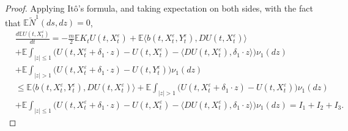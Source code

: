 \documentclass[11pt,reqno]{amsart}
\numberwithin{equation}{section}
\begin{document}
\begin{proof}
Applying It\^{o}'s formula, and taking expectation on both sides, with the fact that $\mathbb{E}\tilde{N}^{1}(ds,dz)=0$,	\begin{equation}\label{3.9}
	\begin{split}
	&\frac{d\mathbb{E}U(t,X_{t}^{\varepsilon})}{dt}=-\frac{m}{2}\mathbb{E}K_{t}U(t,X_{t}^{\varepsilon})+\mathbb{E}\langle  b(t,X_{t}^{\varepsilon},Y_{t}^{\varepsilon}),DU(t,X_{t}^{\varepsilon})\rangle  \\
	&+\mathbb{E} \int_{|z|\leq 1}\big( U(t,X_{t}^{\varepsilon}+\delta_{1}\cdot z)-U(t,X_{t}^{\varepsilon})-\langle  DU(t,X_{t}^{\varepsilon}), \delta_{1}\cdot z\rangle   \big) \nu_{1}(dz)\\
	&+\mathbb{E} \int_{|z|> 1}\big( U(t,X_{t}^{\varepsilon}+\delta_{1}\cdot z)-U(t,Y_{t}^{\varepsilon}) \big) \nu_{1}(dz)\\
	&\leq \mathbb{E} \langle b(t,X_{t}^{\varepsilon},Y_{t}^{\varepsilon}),DU(t,X_{t}^{\varepsilon})\rangle  +\mathbb{E} \int_{|z|> 1}\big( U(t,X_{t}^{\varepsilon}+\delta_{1}\cdot z)-U(t,X_{t}^{\varepsilon}) \big) \nu_{1}(dz)\\
	&+\mathbb{E} \int_{|z|\leq 1}\big( U(t,X_{t}^{\varepsilon}+\delta_{1}\cdot z)-U(t,X_{t}^{\varepsilon})- \langle DU(t,X_{t}^{\varepsilon}), \delta_{1}\cdot z\rangle   \big) \nu_{1}(dz)=I_{1}+I_{2}+I_{3}.
	\end{split}
	\end{equation}


\end{proof}
\end{document}
